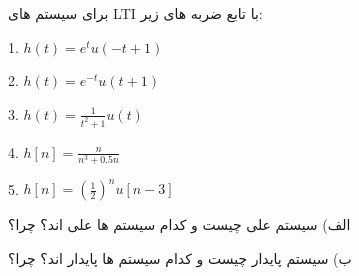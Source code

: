 \documentclass{article}
\begin{document}
%

\large

برای سیستم های LTI با تابع ضربه های زیر:

1.
$h(t)=e^{t}u(-t+1)$

2.
$h(t)=e^{-t}u(t+1)$

3.
$h(t)=\frac{1}{t^2+1}u(t)$

4.
$h[n]=\frac{n}{n^3+0.5n}$

5.
$h[n]=(\frac{1}{2})^nu[n-3]$



الف) سیستم علی چیست و کدام سیستم ها علی اند؟ چرا؟

ب) سیستم پایدار چیست و کدام سیستم ها پایدار اند؟ چرا؟
\end{document}
